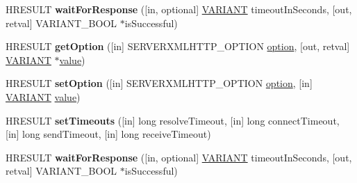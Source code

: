 \begin{DoxyCompactItemize}
\item 
\mbox{\label{interface_m_s_x_m_l2_1_1_i_server_x_m_l_h_t_t_p_request_a2f8cb1e8ab9a8953c9445e89d096ef7e}} 
H\+R\+E\+S\+U\+LT {\bfseries wait\+For\+Response} (\mbox{[}in, optional\mbox{]} \hyperlink{structtag_v_a_r_i_a_n_t}{V\+A\+R\+I\+A\+NT} timeout\+In\+Seconds, \mbox{[}out, retval\mbox{]} V\+A\+R\+I\+A\+N\+T\+\_\+\+B\+O\+OL $\ast$is\+Successful)
\item 
\mbox{\label{interface_m_s_x_m_l2_1_1_i_server_x_m_l_h_t_t_p_request_a321878f891dbf1c3b004a436b32003e0}} 
H\+R\+E\+S\+U\+LT {\bfseries get\+Option} (\mbox{[}in\mbox{]} S\+E\+R\+V\+E\+R\+X\+M\+L\+H\+T\+T\+P\+\_\+\+O\+P\+T\+I\+ON \hyperlink{structoption}{option}, \mbox{[}out, retval\mbox{]} \hyperlink{structtag_v_a_r_i_a_n_t}{V\+A\+R\+I\+A\+NT} $\ast$\hyperlink{unionvalue}{value})
\item 
\mbox{\label{interface_m_s_x_m_l2_1_1_i_server_x_m_l_h_t_t_p_request_a82f2ad35ab8cf252499f1ee5e2f647d2}} 
H\+R\+E\+S\+U\+LT {\bfseries set\+Option} (\mbox{[}in\mbox{]} S\+E\+R\+V\+E\+R\+X\+M\+L\+H\+T\+T\+P\+\_\+\+O\+P\+T\+I\+ON \hyperlink{structoption}{option}, \mbox{[}in\mbox{]} \hyperlink{structtag_v_a_r_i_a_n_t}{V\+A\+R\+I\+A\+NT} \hyperlink{unionvalue}{value})
\item 
\mbox{\label{interface_m_s_x_m_l2_1_1_i_server_x_m_l_h_t_t_p_request_a1791c3ab4f5bfa6aaa606f37cc17a388}} 
H\+R\+E\+S\+U\+LT {\bfseries set\+Timeouts} (\mbox{[}in\mbox{]} long resolve\+Timeout, \mbox{[}in\mbox{]} long connect\+Timeout, \mbox{[}in\mbox{]} long send\+Timeout, \mbox{[}in\mbox{]} long receive\+Timeout)
\item 
\mbox{\label{interface_m_s_x_m_l2_1_1_i_server_x_m_l_h_t_t_p_request_a2f8cb1e8ab9a8953c9445e89d096ef7e}} 
H\+R\+E\+S\+U\+LT {\bfseries wait\+For\+Response} (\mbox{[}in, optional\mbox{]} \hyperlink{structtag_v_a_r_i_a_n_t}{V\+A\+R\+I\+A\+NT} timeout\+In\+Seconds, \mbox{[}out, retval\mbox{]} V\+A\+R\+I\+A\+N\+T\+\_\+\+B\+O\+OL $\ast$is\+Successful)
\item 
\mbox{\label{interface_m_s_x_m_l2_1_1_i_server_x_m_l_h_t_t_p_request_a321878f891dbf1c3b004a436b32003e0}} 

\end{DoxyCompactItemize}
